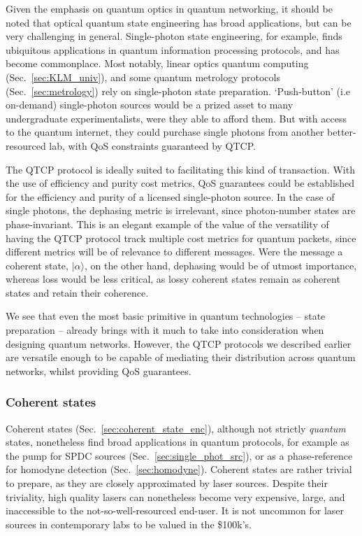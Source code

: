 \documentclass[aps,rmp,twocolumn,amsmath,amssymb,nofootinbib,superscriptaddress,longbibliography,floatfix,table-of-contents,eqsecnum]{revtex4-1}
\newcommand{\ket}[1]{|#1\rangle}
\begin{document}
Given the emphasis on quantum optics in quantum networking, it should be noted that optical quantum state engineering has broad applications, but can be very challenging in general. Single-photon state engineering, for example, finds ubiquitous applications in quantum information processing protocols, and has become commonplace. Most notably, linear optics quantum computing (Sec.~\ref{sec:KLM_univ}), and some quantum metrology protocols (Sec.~\ref{sec:metrology}) rely on single-photon state preparation. `Push-button' (i.e on-demand) single-photon sources would be a prized asset to many undergraduate experimentalists, were they able to afford them. But with access to the quantum internet, they could purchase single photons from another better-resourced lab, with QoS constraints guaranteed by QTCP.

The QTCP protocol is ideally suited to facilitating this kind of transaction. With the use of efficiency and purity cost metrics, QoS guarantees could be established for the efficiency and purity of a licensed single-photon source. In the case of single photons, the dephasing metric is irrelevant, since photon-number states are phase-invariant. This is an elegant example of the value of the versatility of having the QTCP protocol track multiple cost metrics for quantum packets, since different metrics will be of relevance to different messages. Were the message a coherent state, $\ket\alpha$, on the other hand, dephasing would be of utmost importance, whereas loss would be less critical, as lossy coherent states remain as coherent states and retain their coherence.

We see that even the most basic primitive in quantum technologies -- state preparation -- already brings with it much to take into consideration when designing quantum networks. However, the QTCP protocols we described earlier are versatile enough to be capable of mediating their distribution across quantum networks, whilst providing QoS guarantees.

%
%

\subsubsection{Coherent states} \label{sec:coherent_states} 

Coherent states (Sec.~\ref{sec:coherent_state_enc}), although not strictly \textit{quantum} states, nonetheless find broad applications in quantum protocols, for example as the pump for SPDC sources (Sec.~\ref{sec:single_phot_src}), or as a phase-reference for homodyne detection (Sec.~\ref{sec:homodyne}). Coherent states are rather trivial to prepare, as they are closely approximated by laser sources. Despite their triviality, high quality lasers can nonetheless become very expensive, large, and inaccessible to the not-so-well-resourced end-user. It is not uncommon for laser sources in contemporary labs to be valued in the \$100k's.
\end{document}
